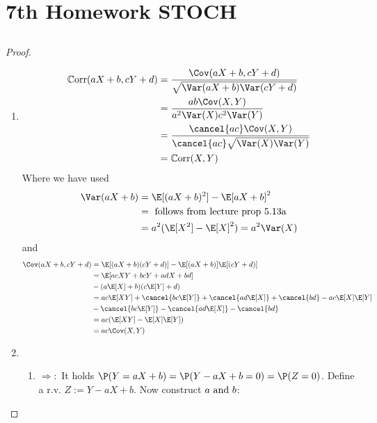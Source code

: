 
\section{7th Homework STOCH}
\subsection{}
\begin{proof}
	\begin{enumerate}
		\item \begin{align*}
			\Corr(aX + b,cY+d) &= \frac{\Cov(aX+b, cY+d)}{\sqrt{\Var(aX+b)\Var(cY+d)}}\\
			&= \frac{ab\Cov(X,Y)}{a^2\Var(X)c^2\Var(Y)}\\
			&= \frac{\cancel{ac}\Cov(X,Y)}{\cancel{ac}\sqrt{\Var(X)\Var(Y)}}\\
			&= \Corr(X,Y)
		\end{align*}
		Where we have used
		\begin{align*}
			\Var(aX+b) &= \E[(aX+b)^2]- \E[aX+b]^2\\
			&= \text{ follows from lecture prop 5.13a}\\
			&= a^2(\E[X^2] - \E[X]^2) = a^2\Var(X)
		\end{align*}
		and 
		\begin{align*}
			\Cov(aX+b,cY+d) &= \E[(aX+b)(cY+d)]-\E[(aX+b)]\E[(cY+d)]\\
			&= \E[acXY + bcY + adX + bd] \\
			&- (a\E[X]+b)(c\E[Y]+d)\\
			&= ac\E[XY]+\cancel{bc\E[Y]} + \cancel{ad\E[X]} + \cancel{bd} - ac\E[X]\E[Y]\\
			&- \cancel{bc \E[Y]} - \cancel{ad\E[X]} - \cancel{bd}\\
			&= ac(\E[XY] - \E[X]\E[Y])\\
			&= ac\Cov(X,Y)
		\end{align*}
		\item
		\begin{enumerate}[label=]
			\item \ul{$\Rightarrow:$} It holds $\P(Y = aX+b) = \P(Y-aX+b = 0) = \P(Z=0)$. Define a r.v. $Z:= Y - aX+b$. Now construct $a \text{ and } b$:

\end{enumerate}
\end{enumerate}
\end{proof}
